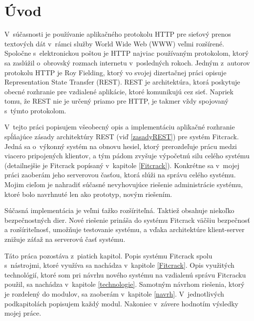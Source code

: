 \documentclass[../projekt.tex]{subfiles}
\begin{document}
\chapter{Úvod}\label{uvod}
V~súčasnosti je používanie aplikačného protokolu HTTP pre sieťový prenos textových dát v~rámci služby World Wide Web (WWW) veľmi rozšírené. Spoločne s~elektronickou poštou je HTTP najviac používaným protokolom, ktorý sa zaslúžil o~obrovský rozmach internetu v~posledných rokoch. Jedným z~autorov protokolu HTTP je Roy Fielding, ktorý vo svojej dizertačnej práci opisuje Representation State Transfer (REST). REST je architektúra, ktorá poskytuje obecné rozhranie pre vzdialené aplikácie, ktoré komunikujú cez sieť. Napriek tomu, že REST nie je určený priamo pre HTTP, je takmer vždy spojovaný s~týmto protokolom.

V~tejto práci popisujem všeobecný opis a implementáciu aplikačné rozhranie spĺňajúce zásady architektúry REST (viď \ref{zasadyREST}) pre systém Fitcrack. Jedná sa o~výkonný systém na obnovu hesiel, ktorý prerozdeľuje prácu medzi viacero pripojených klientov, a tým pádom zvyšuje výpočetnú silu celého systému (detailnejšie je Fitcrack popísaný v~kapitole \ref{Fitcrack}). Konkrétne sa v~mojej práci zaoberám jeho serverovou časťou, ktorá slúži na správu celého systému. Mojim cieľom je nahradiť súčasné nevyhovujúce riešenie administrácie systému, ktoré bolo navrhnuté len ako prototyp, novým riešením.

Súčasná implementácia je veľmi ťažko rozšíriteľná. Taktiež obsahuje niekoľko bezpečnostných dier. Nové riešenie prináša do systému Fitcrack väčšiu bezpečnosť a rozšíriteľnosť, umožňuje testovanie systému, a vďaka architektúre klient-server znižuje záťaž na serverovú časť systému.

Táto práca pozostáva z~piatich kapitol. Popis systému Fitcrack spolu s~nástrojmi, ktoré využíva sa nachádza v~kapitole \ref{Fitcrack}. Opis využitých technológií, ktoré som pri návrhu nového systému na vzdialenú správu Fitcracku použil, sa nachádza v~kapitole \ref{technologie}. Samotným návrhom riešenia, ktorý je rozdelený do modulov, sa zaoberám v~kapitole \ref{navrh}. V~jednotlivých podkapitolách popisujem každý modul. Nakoniec v~závere hodnotím výsledky mojej práce. 
\end{document}
